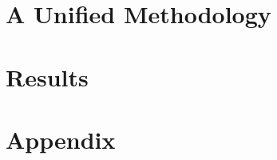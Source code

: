 
\cleardoublepage %


\ctparttext{} %
\part{A Unified Methodology} %


\ctparttext{} %
\part{Results} %



\cleardoublepage %


\appendix

\part{Appendix} %




\cleardoublepage %
\cleardoublepage %
\cleardoublepage %



